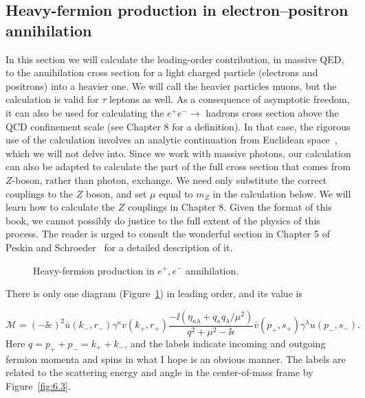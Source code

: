 \subsection{Heavy-fermion production in electron--positron annihilation}

In this section we will calculate the leading-order contribution, in massive QED, to the
annihilation cross section for a light charged particle (electrons and positrons) into a
heavier one. We will call the heavier particles muons, but the calculation is valid for
$\tau$ leptons as well. As a consequence of asymptotic freedom, it can also be used for
calculating the $e^+e^-\to$ hadrons cross section above the QCD confinement scale (see
Chapter 8 for a definition). In that case, the rigorous use of the calculation involves an
analytic continuation from Euclidean space~\cite{banks-ref-32}, which we will not delve into.
Since we work with massive photons, our calculation can also be adapted to calculate the part
of the full cross section that comes from $Z$-boson, rather than photon, exchange. We
need only substitute the correct couplings to the $Z$ boson, and set $\mu$ equal to $m_Z$ in the
calculation below. We will learn how to calculate the $Z$ couplings in Chapter 8. Given
the format of this book, we cannot possibly do justice to the full extent of the physics
of this process. The reader is urged to consult the wonderful section in Chapter 5 of
Peskin and Schroeder~\cite{banks-ref-33} for a detailed description of it.

\begin{figure}[htbp]
  \centering
  
  \caption{Heavy-fermion production in $e^+,e^-$ annihilation.}
  \label{fig:6.2}
\end{figure}

There is only one diagram (Figure~\ref{fig:6.2}) in leading order, and its value is

\begin{equation}
  \mathcal{M}=(-\ii e)^2\bar u(k_-,r_- )\gamma^\kappa v(k_+,r_+ )
  \frac{-\ii(\eta_{\kappa\lambda}+q_\kappa q_\lambda/\mu^2)}
  {q^2+\mu^2-\ii\epsilon}
  \bar v(p_+,s_+)\gamma^\lambda u(p_-,s_-).
  \label{eq:6.6}
\end{equation}
Here $q=p_++p_-=k_++k_-$, and the labels indicate incoming and outgoing fermion
momenta and spins in what I hope is an obvious manner. The labels are related to the
scattering energy and angle in the center-of-mass frame by Figure~\ref{fig:6.3}.

